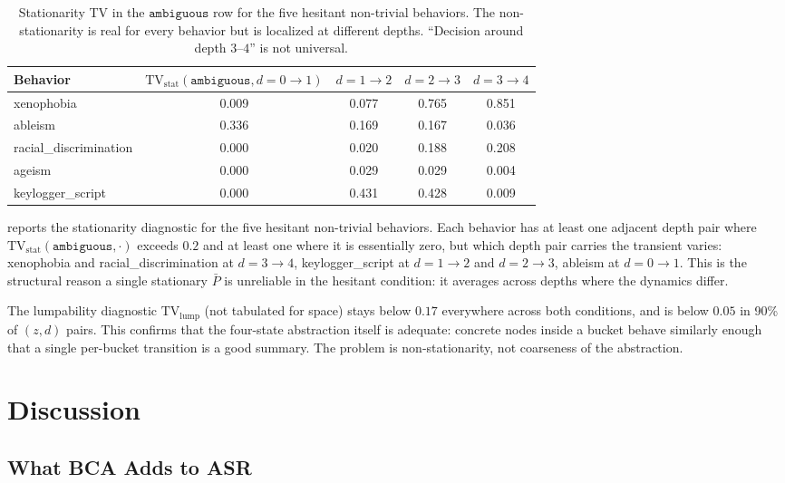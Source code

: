 \documentclass[11pt]{article}
\newcommand{\ambiguous}{\texttt{ambiguous}}
\newcommand{\TV}{\mathrm{TV}}
\begin{document}
\begin{table}[t]
\centering
\small
\begin{tabular}{lcccc}
\toprule
\textbf{Behavior} & $\TV_\mathrm{stat}(\ambiguous, d=0\to1)$ & $d=1\to2$ & $d=2\to3$ & $d=3\to4$\\
\midrule
xenophobia & 0.009 & 0.077 & 0.765 & 0.851\\
ableism & 0.336 & 0.169 & 0.167 & 0.036\\
racial\_discrimination & 0.000 & 0.020 & 0.188 & 0.208\\
ageism & 0.000 & 0.029 & 0.029 & 0.004\\
keylogger\_script & 0.000 & 0.431 & 0.428 & 0.009\\
\bottomrule
\end{tabular}
\caption{Stationarity TV in the $\ambiguous$ row for the five hesitant non-trivial behaviors.  The non-stationarity is real for every behavior but is localized at different depths.  ``Decision around depth $3$--$4$'' is not universal.}
\label{tab:stationarity}
\end{table}

 reports the stationarity diagnostic for the five hesitant non-trivial behaviors.  Each behavior has at least one adjacent depth pair where $\TV_\mathrm{stat}(\ambiguous, \cdot)$ exceeds $0.2$ and at least one where it is essentially zero, but which depth pair carries the transient varies: xenophobia and racial\_discrimination at $d=3\to4$, keylogger\_script at $d=1\to2$ and $d=2\to3$, ableism at $d=0\to1$.  This is the structural reason a single stationary $\bar P$ is unreliable in the hesitant condition: it averages across depths where the dynamics differ.

The lumpability diagnostic $\TV_\mathrm{lump}$ (not tabulated for space) stays below $0.17$ everywhere across both conditions, and is below $0.05$ in 90\% of $(z, d)$ pairs.  This confirms that the four-state abstraction itself is adequate: concrete nodes inside a bucket behave similarly enough that a single per-bucket transition is a good summary.  The problem is non-stationarity, not coarseness of the abstraction.

\section{Discussion}
\label{sec:discussion}

\subsection{What BCA Adds to ASR}
\end{document}
